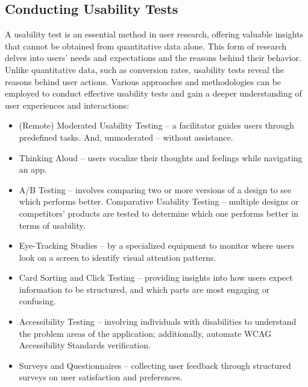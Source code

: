 
\subsection{Conducting Usability Tests} \label{usability}

A usability test is an essential method in user research, offering valuable insights that cannot be obtained from 
quantitative data alone. This form of research delves into users' needs and expectations and the reasons behind their 
behavior. Unlike quantitative data, such as conversion rates, usability tests reveal the reasons behind user actions. 
Various approaches and methodologies can be employed to conduct effective usability tests and gain a deeper 
understanding of user experiences and interactions:

\begin{itemize}
  \item (Remote) Moderated Usability Testing -- a facilitator guides users through predefined tasks. And, unmoderated 
  -- without assistance.

  \item Thinking Aloud -- users vocalize their thoughts and feelings while navigating an app.

  \item A/B Testing -- involves comparing two or more versions of a design to see which performs better. 
  Comparative Usability Testing -- multiple designs or competitors' products are tested to determine which one 
  performs better in terms of usability.

  \item Eye-Tracking Studies -- by a specialized equipment to monitor where users look on a screen to identify visual 
  attention patterns.

  \item Card Sorting and Click Testing -- providing insights into how users expect information to be structured, and 
  which parts are most engaging or confusing.

  \item Accessibility Testing -- involving individuals with disabilities to understand the problem areas of the 
  application; additionally, automate WCAG Accessibility Standards verification.

  \item Surveys and Questionnaires -- collecting user feedback through structured surveys on user satisfaction and 
  preferences.
\end{itemize}
